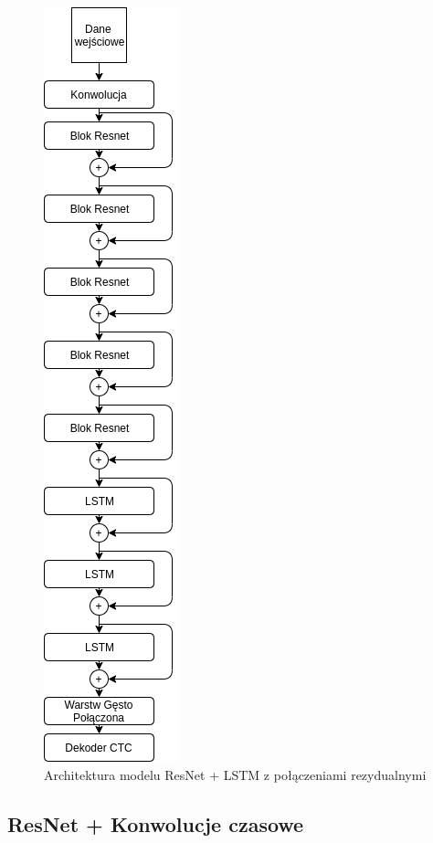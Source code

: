 \documentclass[a4paper,11pt,twoside]{report}
\theoremstyle{definition}
\begin{document}
\begin{figure}[h!]
	\centering
	\includegraphics[scale=0.7]{resnetLstm}
	\caption{Architektura modelu ResNet + LSTM z połączeniami rezydualnymi}
\end{figure}

\subsection{ResNet + Konwolucje czasowe}
\end{document}

